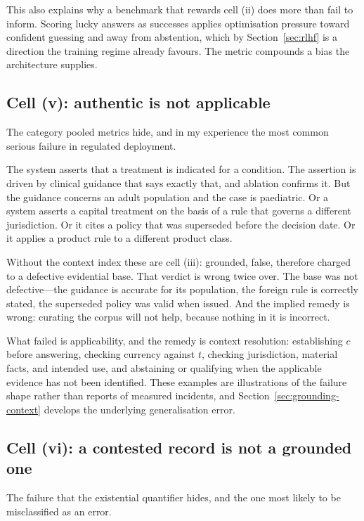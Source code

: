 This also explains why a benchmark that rewards cell (ii) does more than fail to
inform. Scoring lucky answers as successes applies
optimisation pressure toward confident guessing and away from abstention, which by
Section~\ref{sec:rlhf} is a direction the training regime already favours. The
metric compounds a bias the architecture supplies.

\subsection{Cell (v): authentic is not applicable}
\label{sec:cell-v}

The category pooled metrics hide, and in my experience the most common serious
failure in regulated deployment.

The system asserts that a treatment is indicated for a condition. The assertion is
driven by clinical guidance that says exactly that, and ablation confirms it. But
the guidance concerns an adult population and the case is paediatric. Or a system
asserts a capital treatment on the basis of a rule that governs a different
jurisdiction. Or it cites a policy that was superseded before the decision date. Or
it applies a product rule to a different product class.

Without the context index these are cell (iii): grounded, false, therefore charged
to a defective evidential base. That verdict is wrong twice over. The base was not
defective---the guidance is accurate for its population, the foreign rule is
correctly stated, the superseded policy was valid when issued. And the implied
remedy is wrong: curating the corpus will not help, because nothing in it is
incorrect.

What failed is applicability, and the remedy is context resolution: establishing
$c$ before answering, checking currency against $t$, checking jurisdiction,
material facts, and intended use, and abstaining or qualifying when the applicable
evidence has not been identified. These examples are illustrations of the failure
shape rather than reports of measured incidents, and
Section~\ref{sec:grounding-context} develops the underlying generalisation error.
\subsection{Cell (vi): a contested record is not a grounded one}
\label{sec:contested}

The failure that the existential quantifier hides, and the one most likely to be
misclassified as an error.

